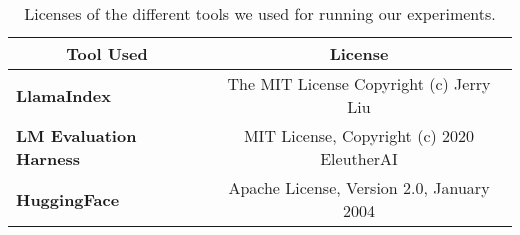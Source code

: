 \begin{table}[h]
\centering
\begin{tabular}{@{}lcl@{}}
\toprule
\multicolumn{1}{c}{\textbf{Tool Used}} & \multicolumn{2}{c}{\textbf{License}}                          \\ \midrule
\textbf{LlamaIndex}                    & \multicolumn{2}{c}{The MIT License Copyright (c) Jerry Liu}   \\
\textbf{LM Evaluation Harness} & \multicolumn{2}{c}{MIT License,  Copyright (c) 2020 EleutherAI} \\
\textbf{HuggingFace}                   & \multicolumn{2}{c}{Apache License, Version 2.0, January 2004} \\ \bottomrule
\end{tabular}%
\caption{Licenses of the different tools we used for running our experiments.}
\label{tab:licenses}
\end{table}
